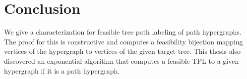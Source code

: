 \documentclass[MS,synopsis]{iitmdiss}
\begin{document}


\section{Conclusion}
\label{sec:conclusion}
\vspace{\secfirstparatrim} 

We give a characterization for feasible tree path labeling of path
hypergraphs. The proof for this is constructive and computes a
feasibility bijection mapping vertices of the hypergraph to vertices
of the given target tree. This thesis also discovered an exponential algorithm
that computes a feasible TPL to a given hypergraph if it is a path hypergraph.
\end{document}
